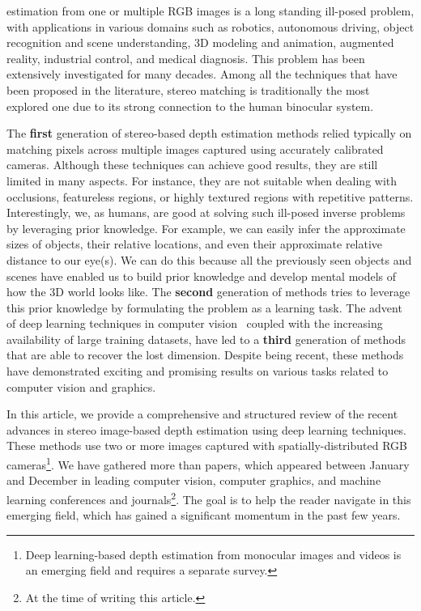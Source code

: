 \documentclass[10pt,journal,compsoc]{IEEEtran}
\begin{document}
 estimation from one or multiple RGB images  is a long standing ill-posed problem, with applications in various domains such as  robotics, autonomous driving, object recognition and scene understanding, 3D modeling and animation, augmented reality, industrial control, and medical diagnosis.  This problem has been extensively investigated for many decades. Among all the techniques that have been proposed in the literature, stereo matching is  traditionally the most explored one  due to its strong connection to the human binocular system.  

The \textbf{first} generation of  stereo-based depth estimation methods  relied typically   on matching pixels across  multiple images captured using accurately calibrated cameras. Although these techniques can achieve good results, they are still limited in many aspects. For instance, they are not suitable when dealing with occlusions, featureless regions, or highly textured regions with repetitive patterns. 
Interestingly, we, as humans, are good at solving such ill-posed inverse problems by leveraging prior knowledge. For example, we can easily infer the approximate  sizes of  objects, their relative locations, and even their approximate relative distance to our eye(s).  We can do this because all the previously seen objects and scenes have enabled us to build  prior knowledge and develop mental models of how the 3D world   looks like. The \textbf{second} generation of  methods tries to leverage this prior knowledge by formulating the problem as a learning task. The advent of deep learning techniques in computer vision~\cite{khan2018guide} coupled with the increasing availability of large training datasets, have led to a \textbf{third} generation of methods that are able to recover the lost dimension.  Despite being recent, these methods have demonstrated  exciting and promising results on various tasks related to computer vision and graphics.

In this article,  we provide a comprehensive and structured review of the recent advances in stereo image-based depth estimation using deep learning  techniques. These methods use two or more images captured with spatially-distributed RGB cameras\footnote{Deep learning-based depth estimation from monocular images and videos is an emerging field and requires  a separate survey.}. We have gathered more than  papers, which appeared between January   and December  in leading computer vision, computer graphics, and machine learning conferences and journals\footnote{At the time of writing this article.}.  The goal is to help the reader navigate in this emerging field, which has gained a significant momentum in the past few years. 
\end{document}

